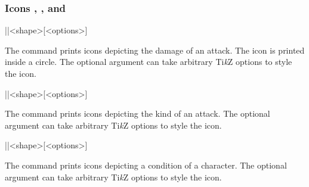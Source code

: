 \documentclass[a4paper]{article}
\begin{document}
\subsubsection[Icons \textbackslash damage, \textbackslash attack, and \textbackslash condition]{Icons , , and }

\begin{macrodef}|\damage|{<shape>}[<options>]\end{macrodef}
The command \macro{\damage} prints icons depicting the damage of an attack. The icon is printed inside a circle. The optional argument can take arbitrary Ti\emph{k}Z options to style the icon.

\begin{macrodef}|\attack|{<shape>}[<options>]\end{macrodef}
The command \macro{\attack} prints icons depicting the kind of an attack. The optional argument can take arbitrary Ti\emph{k}Z options to style the icon.

\begin{macrodef}|\condition|{<shape>}[<options>]\end{macrodef}
The command \macro{\condition} prints icons depicting a condition of a character. The optional argument can take arbitrary Ti\emph{k}Z options to style the icon.
\end{document}
